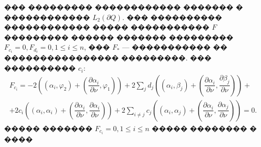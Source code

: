 \documentclass[a4paper]{article}
\begin{document}
��� ��������� ������������ ������� � ������������ $L_2(\partial Q)$.
��� ���������� ������������ ����� ����������� $F$ ��������� ������ ������� ��������� $F_{c_i}=0, F_{d_i}=0, 1\leq i \leq n$, ���
$F_*$ --- ����������� �� ���������������� ���������. ��� ���������� $c_i$:
\begin{multline}
  F_{c_i}=-2\left((\alpha_i,\varphi_2)+\left( \dfrac{\partial \alpha_i}{\partial \nu},\varphi_1 \right)\right)+ 2 \sum_j d_j \left((\alpha_i,\beta_j)+\left( \dfrac{\partial \alpha_i}{\partial \nu},\dfrac{\partial \beta_j}{\partial \nu} \right)\right)+\\
  +2 c_i \left((\alpha_i,\alpha_i)+\left( \dfrac{\partial \alpha_i}{\partial \nu},\dfrac{\partial \alpha_i}{\partial \nu} \right)\right)+2\sum_{i \ne j} c_j \left((\alpha_i,\alpha_j)+\left( \dfrac{\partial \alpha_i}{\partial \nu},\dfrac{\partial \alpha_j}{\partial \nu} \right)\right)=0.
\end{multline}
����� ������� $F_{c_i}=0,1\leq i \leq n$ ����� �������� � ����
\end{document}
